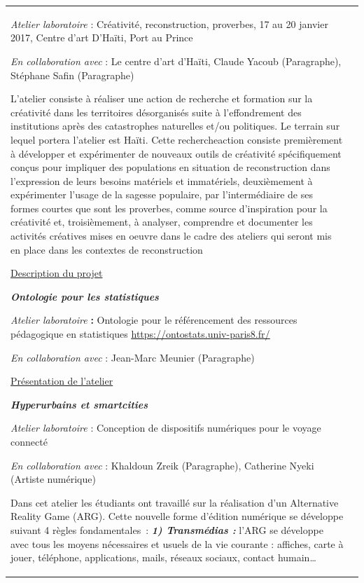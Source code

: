 \documentclass[
  a4paper,
  DIV=11,
  numbers=noendperiod]{scrreprt}
\begin{document}
\begin{longtable}[]{@{}
  >{\raggedright\arraybackslash}p{}
  >{\raggedright\arraybackslash}p{}@{}}
\emph{Atelier laboratoire} : Créativité, reconstruction, proverbes, 17
au 20 janvier 2017, Centre d'art D'Haïti, Port au Prince

\emph{En collaboration avec} : Le centre d'art d'Haïti, Claude Yacoub
(Paragraphe), Stéphane Safin (Paragraphe)

L'atelier consiste à réaliser une action de recherche et formation sur
la créativité dans les territoires désorganisés suite à l'effondrement
des institutions après des catastrophes naturelles et/ou politiques. Le
terrain sur lequel portera l'atelier est Haïti. Cette recherche­action
consiste premièrement à développer et expérimenter de nouveaux outils de
créativité spécifiquement conçus pour impliquer des populations en
situation de reconstruction dans l'expression de leurs besoins matériels
et immatériels, deuxièmement à expérimenter l'usage de la sagesse
populaire, par l'intermédiaire de ses formes courtes que sont les
proverbes, comme source d'inspiration pour la créativité et,
troisièmement, à analyser, comprendre et documenter les activités
créatives mises en oeuvre dans le cadre des ateliers qui seront mis en
place dans les contextes de reconstruction

\href{/annexes/AtelierCReP-Description.pdf}{Description du projet}

\textbf{\emph{Ontologie pour les statistiques}}

\emph{Atelier laboratoire} \textbf{:} Ontologie pour le référencement
des ressources pédagogique en statistiques
\href{https://ontostats.univ-paris8.fr/}{\ul{https://ontostats.univ-paris8.fr/}}

\emph{En collaboration avec} : Jean-Marc Meunier (Paragraphe)

\href{/annexes/e-educationV1.pdf}{Présentation de l'atelier}

\textbf{\emph{Hyperurbains et smartcities}}

\emph{Atelier laboratoire} : Conception de dispositifs numériques pour
le voyage connecté

\emph{En collaboration avec} : Khaldoun Zreik (Paragraphe), Catherine
Nyeki (Artiste numérique)

Dans cet atelier les étudiants ont travaillé sur la réalisation d'un
Alternative Reality Game (ARG). Cette nouvelle forme d'édition numérique
se développe suivant 4 règles fondamentales~: \textbf{\emph{1)
Transmédias :}} l'ARG se développe avec tous les moyens nécessaires et
usuels de la vie courante : affiches, carte à jouer, téléphone,
applications, mails, réseaux sociaux, contact humain\ldots{}


\end{longtable}
\end{document}
